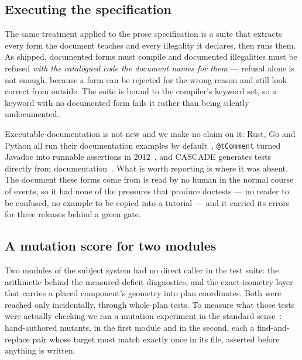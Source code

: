 \documentclass[10pt,journal,compsoc]{IEEEtran}
\begin{document}
\subsection{Executing the specification}

The same treatment applied to the prose specification is a suite that extracts every form the
document teaches and every illegality it declares, then runs them. As shipped,
\factSpecFormsCompile{} documented forms must compile and \factSpecFormsRefused{} documented
illegalities must be refused \emph{with the catalogued code the document names for them} ---
refusal alone is not enough, because a form can be rejected for the wrong reason and still look
correct from outside. The suite is bound to the compiler's keyword set, so a keyword with no
documented form fails it rather than being silently undocumented.

Executable documentation is not new and we make no claim on it: Rust, Go and Python all run
their documentation examples by default~\cite{rust_doctests,go_testable_examples,python_doctest},
\texttt{@tComment} turned Javadoc into runnable assertions in
2012~\cite{tan2012tcomment}, and CASCADE generates tests directly from
documentation~\cite{kiecker2026cascade}. What is worth reporting is where it was absent. The
document these forms come from is read by no human in the normal course of events, so it had
none of the pressures that produce doctests --- no reader to be confused, no example to be
copied into a tutorial --- and it carried its errors for three releases behind a green gate.

\subsection{A mutation score for two modules}

Two modules of the subject system had no direct caller in the test suite: the arithmetic behind
the measured-deficit diagnostics, and the exact-isometry layer that carries a placed component's
geometry into plan coordinates. Both were reached only incidentally, through whole-plan tests.
To measure what those tests were actually checking we ran a mutation experiment in the standard
sense~\cite{demillo1978hints,jia2011mutationsurvey}: \factMutants{} hand-authored mutants,
\factMutantsMeasure{} in the first module and \factMutantsFrame{} in the second, each a
find-and-replace pair whose target must match exactly once in its file, asserted before anything
is written.
\end{document}
